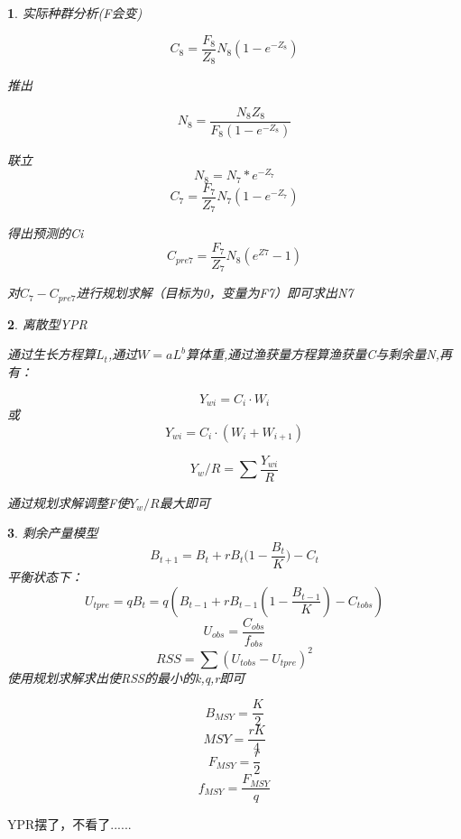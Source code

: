 \documentclass[12pt, a4paper, oneside]{ctexart}
\newtheorem{theorem}{}
\begin{document}
\begin{theorem}实际种群分析(F会变)

    $$C_8=\frac{F_8}{Z_8}N_8(1-e^{-Z_8})$$

    推出

    $$N_8=\frac{N_8Z_8}{F_8(1-e^{-Z_8})}$$

    联立
    $$N_8=N_7*e^{-Z_7}$$
    $$C_7=\frac{F_7}{Z_7}N_7(1-e^{-Z_7})$$

    得出预测的Ci
    $$C_{pre7}=\frac{F_7}{Z_7}N_8(e^{Z7}-1)$$

    对$C_7-C_{pre7}$进行规划求解（目标为0，变量为F7）即可求出N7
    
\end{theorem}

\begin{theorem}离散型YPR

    通过生长方程算$L_t$,通过$W=aL^b$算体重,通过渔获量方程算渔获量C与剩余量N,再有：

    $$Y_{wi}=C_i \cdot W_i$$
    或
    $$Y_{wi}=C_i \cdot (W_i+W_{i+1})$$

    $$Y_{w}/R=\sum \frac{Y_{wi}}{R}$$

    通过规划求解调整F使$Y_{w}/R$最大即可
\end{theorem}

\begin{theorem}剩余产量模型
    $$B_{t+1}=B_t+rB_t\big(1-\frac{B_t}{K}\big)-C_t$$
    平衡状态下：
    $$U_{tpre}=qB_t=q(B_{t-1}+rB_{t-1}(1-\frac{B_{t-1}}{K})-C_{tobs})$$
    $$U_{obs}=\frac{C_{obs}}{f_{obs}}$$
    $$RSS=\sum (U_{tobs}-U_{tpre})^2$$
    使用规划求解求出使RSS的最小的k,q,r即可
    
    $$B_{MSY}=\frac{K}{2}$$
    $$MSY=\frac{rK}{4}$$
    $$F_{MSY}=\frac{r}{2}$$
    $$f_{MSY}=\frac{F_{MSY}}{q}$$
\end{theorem}

YPR摆了，不看了......
\end{document}
